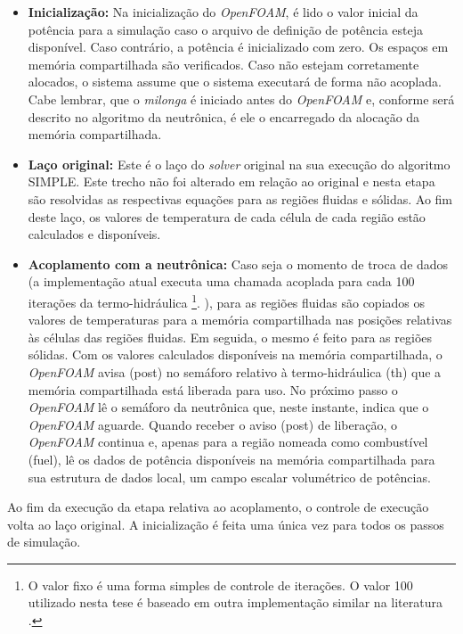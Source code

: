\begin{itemize}
\item \textbf{Inicialização:} Na inicialização do \textit{OpenFOAM}, é lido o valor inicial da potência para
  a simulação caso o arquivo de definição de potência esteja disponível. Caso contrário, a potência é inicializado
  com zero. Os espaços em memória compartilhada são verificados. Caso não estejam corretamente alocados, o sistema
  assume que o sistema executará de forma não acoplada. Cabe lembrar,
  que  o \textit{milonga} é iniciado antes do \textit{OpenFOAM} e, conforme será descrito no algoritmo da neutrônica, é
  ele o encarregado da alocação da memória compartilhada.

\item \textbf{Laço original:} Este é o laço do \textit{solver} original na sua execução do algoritmo SIMPLE. Este
  trecho não foi alterado em relação ao original e nesta etapa são resolvidas as respectivas equações
  para as regiões fluidas e sólidas. Ao fim
  deste laço, os valores de temperatura de cada célula de cada região estão calculados e disponíveis.

\item \textbf{Acoplamento com a neutrônica:} Caso seja o momento de troca de dados (a implementação atual
  executa uma chamada acoplada para cada 100 iterações da termo-hidráulica
  \footnote{O valor fixo é uma forma simples de controle de iterações. O valor 100 utilizado nesta tese
  é baseado em outra implementação similar na literatura \cite{Jareteg2014}.}.
  ), para as regiões fluidas são copiados os valores
  de temperaturas para a memória compartilhada nas posições relativas às células das regiões fluidas. Em seguida, o mesmo
  é feito para as regiões sólidas. Com os valores calculados disponíveis na memória compartilhada, o \textit{OpenFOAM}
  avisa (post) no semáforo relativo à termo-hidráulica (th) que a memória compartilhada está liberada para uso. No próximo
  passo o \textit{OpenFOAM} lê o semáforo da neutrônica que, neste instante, indica que o \textit{OpenFOAM} aguarde. Quando
  receber o aviso (post) de liberação, o \textit{OpenFOAM} continua e, apenas para a região nomeada como combustível (fuel),
  lê os dados de potência disponíveis na memória compartilhada para sua estrutura de dados local, um campo escalar volumétrico
  de potências.
\end{itemize}

Ao fim da execução da etapa relativa ao acoplamento, o controle de execução volta ao laço original. A inicialização é
feita uma única vez para todos os passos de simulação.

